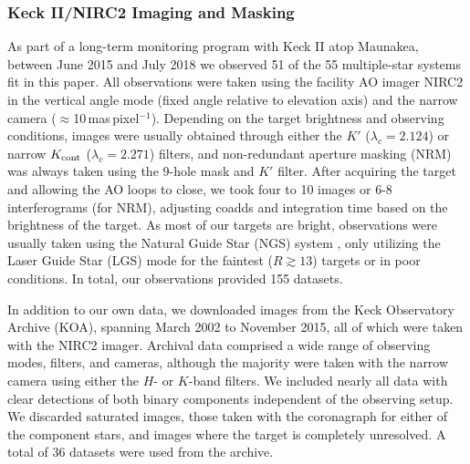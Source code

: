 \documentclass[twocolumn]{aastex62}
\begin{document}
\subsubsection{Keck II/NIRC2 Imaging and Masking}%
As part of a long-term monitoring program with Keck II atop Maunakea, between June 2015 and July 2018 we observed 51 of the 55 multiple-star systems fit in this paper. All observations were taken using the facility AO imager NIRC2 in the vertical angle mode (fixed angle relative to elevation axis) and the narrow camera ($\approx$10\,mas\,pixel$^{-1}$). Depending on the target brightness and observing conditions, images were usually obtained through either the $K'$ ($\lambda_c=2.124$\um) or narrow $K_{\rm{cont}}$ ($\lambda_c=2.271$\um) filters, and non-redundant aperture masking (NRM) was always taken using the 9-hole mask and $K'$ filter. After acquiring the target and allowing the AO loops to close, we took four to 10 images or 6-8 interferograms (for NRM), adjusting coadds and integration time based on the brightness of the target. As most of our targets are bright, observations were usually taken using the Natural Guide Star (NGS) system \citep{2000PASP..112..315W,2004ApOpt..43.5458V}, only utilizing the Laser Guide Star (LGS) mode for the faintest ($R\gtrsim13$) targets or in poor conditions. In total, our observations provided 155 datasets.%

In addition to our own data, we downloaded images from the Keck Observatory Archive (KOA), spanning March 2002 to November 2015, all of which were taken with the NIRC2 imager. Archival data comprised a wide range of observing modes, filters, and cameras, although the majority were taken with the narrow camera using either the $H$- or $K$-band filters. We included nearly all data with clear detections of both binary components independent of the observing setup. We discarded saturated images, those taken with the coronagraph for either of the component stars, and images where the target is completely unresolved. A total of 36 datasets were used from the archive. 
\end{document}
